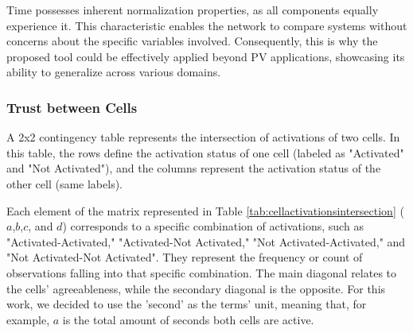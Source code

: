 Time possesses inherent normalization properties, as all components equally experience it. This characteristic enables the network to compare systems without concerns about the specific variables involved. Consequently, this is why the proposed tool could be effectively applied beyond PV applications, showcasing its ability to generalize across various domains.

\subsubsection{Trust between Cells}

A 2x2 contingency table represents the intersection of activations of two cells. In this table, the rows define the activation status of one cell (labeled as "Activated" and "Not Activated"), and the columns represent the activation status of the other cell (same labels).

\begin{table}[h!]
    \centering
    \caption{Contigency table representing the activation intersection of two cells.}
    \label{tab:cellactivationsintersection}
\end{table}

Each element of the matrix represented in Table \ref{tab:cellactivationsintersection} ($a$,$b$,$c$, and $d$) corresponds to a specific combination of activations, such as "Activated-Activated," "Activated-Not Activated," "Not Activated-Activated," and "Not Activated-Not Activated". They represent the frequency or count of observations falling into that specific combination. The main diagonal relates to the cells' agreeableness, while the secondary diagonal is the opposite. For this work, we decided to use the 'second' as the terms' unit, meaning that, for example, $a$ is the total amount of seconds both cells are active.

